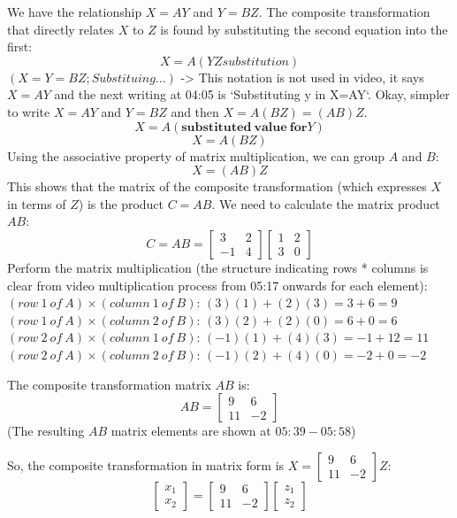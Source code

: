 \documentclass{article}
\begin{document}
We have the relationship $X = AY$ and $Y = BZ$. The composite transformation that directly relates $X$ to $Z$ is found by substituting the second equation into the first:
\[ X = A (YZ substitution) \]
$(X = Y = BZ; Substituing...) $ -> This notation is not used in video, it says $X = AY$ and the next writing at 04:05 is `Substituting y in X=AY`. Okay, simpler to write $X = AY$ and $Y=BZ$ and then $X = A(BZ) = (AB)Z$.
\[ X = A(\mathbf{substituted\ value\ for} Y) \]
\[ X = A (BZ) \]
Using the associative property of matrix multiplication, we can group $A$ and $B$:
\[ X = (AB) Z \]
This shows that the matrix of the composite transformation (which expresses $X$ in terms of $Z$) is the product $C = AB$.
We need to calculate the matrix product $AB$:
\[ C = AB = \begin{bmatrix} 3 & 2 \\ -1 & 4 \end{bmatrix} \begin{bmatrix} 1 & 2 \\ 3 & 0 \end{bmatrix} \]
Perform the matrix multiplication (the structure indicating rows * columns is clear from video multiplication process from 05:17 onwards for each element):
$(row\ 1\ of\ A) \times (column\ 1\ of\ B)$: $(3)(1) + (2)(3) = 3 + 6 = 9$
$(row\ 1\ of\ A) \times (column\ 2\ of\ B)$: $(3)(2) + (2)(0) = 6 + 0 = 6$
$(row\ 2\ of\ A) \times (column\ 1\ of\ B)$: $(-1)(1) + (4)(3) = -1 + 12 = 11$
$(row\ 2\ of\ A) \times (column\ 2\ of\ B)$: $(-1)(2) + (4)(0) = -2 + 0 = -2$

The composite transformation matrix $AB$ is:
\[ AB = \begin{bmatrix} 9 & 6 \\ 11 & -2 \end{bmatrix} \]
(The resulting $AB$ matrix elements are shown at $05:39-05:58$)

So, the composite transformation in matrix form is $X = \begin{bmatrix} 9 & 6 \\ 11 & -2 \end{bmatrix} Z$:
\[ \begin{bmatrix} x_1 \\ x_2 \end{bmatrix} = \begin{bmatrix} 9 & 6 \\ 11 & -2 \end{bmatrix} \begin{bmatrix} z_1 \\ z_2 \end{bmatrix} \]
\end{document}

